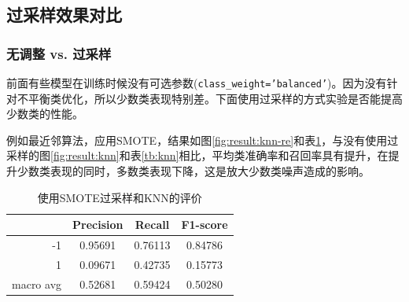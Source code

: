 \documentclass[a4paper]{article}
\begin{document}
\clearpage
\subsection{过采样效果对比}
\label{sec:resample}

\subsubsection{无调整 vs. 过采样}

前面有些模型在训练时候没有可选参数(\texttt{class\_weight='balanced'})。因为没有针对不平衡类优化，所以少数类表现特别差。下面使用过采样的方式实验是否能提高少数类的性能。

例如最近邻算法，应用SMOTE，结果如图\ref{fig:result:knn-re}和表\ref{tb:knn-re}，与没有使用过采样的图\ref{fig:result:knn}和表\ref{tb:knn}相比，平均类准确率和召回率具有提升，在提升少数类表现的同时，多数类表现下降，这是放大少数类噪声造成的影响。

\begin{table}[!h]
    \centering
    \renewcommand{\arraystretch}{1.5}
    \begin{tabular}{|r|c|c|c|}
        \hline
                  & Precision & Recall & F1-score \\ \hline
        -1        &     0.95691     &     0.76113   &    0.84786      \\ \hline
        1         &     0.09671      &     0.42735   &   0.15773       \\ \hline
        macro avg &      0.52681     &     0.59424   &    0.50280      \\ \hline
    \end{tabular}
    \caption{使用SMOTE过采样和KNN的评价}
    \label{tb:knn-re}
\end{table}
\end{document}
